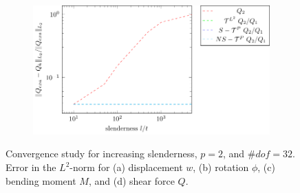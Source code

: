 \begin{figure}
\begin{subfigure}[b]{0.49\linewidth}
        \caption{}
        \vspace*{2mm}
    \end{subfigure}
    \begin{subfigure}[b]{0.49\linewidth}        %
        \centering
        \includegraphics[width=\linewidth]{slenderness_Q}
        \caption{}
        \vspace*{2mm}
    \end{subfigure}
    \caption{Convergence study for increasing slenderness, $p=2$, and $\#{dof}=32$. Error in the $L^2$-norm for (a) displacement $w$, (b) rotation $\phi$, (c) bending moment $M$, and (d) shear force $Q$.}
    \label{fig:slenderness}
\end{figure}


